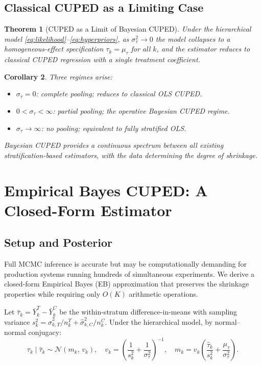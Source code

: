 \documentclass[12pt]{article}
\theoremstyle{plain}
\newtheorem{theorem}{Theorem}
\newtheorem{corollary}[theorem]{Corollary}
\theoremstyle{definition}
\begin{document}
\subsection{Classical CUPED as a Limiting Case}

\begin{theorem}[CUPED as a Limit of Bayesian CUPED]
\label{thm:limit}
Under the hierarchical model \eqref{eq:likelihood}--\eqref{eq:hyperpriors},
as $\sigma_\tau^2 \to 0$ the model collapses to a homogeneous-effect
specification $\tau_k = \mu_\tau$ for all $k$, and the estimator reduces to
classical CUPED regression with a single treatment coefficient.
\end{theorem}

\begin{corollary}
\label{cor:spectrum}
Three regimes arise:
\begin{itemize}[nosep]
  \item $\sigma_\tau = 0$: complete pooling; reduces to classical OLS CUPED.
  \item $0 < \sigma_\tau < \infty$: partial pooling; the operative Bayesian
        CUPED regime.
  \item $\sigma_\tau \to \infty$: no pooling; equivalent to fully stratified
        OLS.
\end{itemize}
Bayesian CUPED provides a continuous spectrum between all existing
stratification-based estimators, with the data determining the degree of
shrinkage.
\end{corollary}

\section{Empirical Bayes CUPED: A Closed-Form Estimator}
\label{sec:eb}

\subsection{Setup and Posterior}

Full MCMC inference is accurate but may be computationally demanding for
production systems running hundreds of simultaneous experiments.
We derive a closed-form Empirical Bayes (EB) approximation that preserves
the shrinkage properties while requiring only $O(K)$ arithmetic operations.

Let $\hat{\tau}_k = \bar{Y}_k^T - \bar{Y}_k^C$ be the within-stratum
difference-in-means with sampling variance
$s_k^2 = \hat{\sigma}_{k,T}^2/n_k^T + \hat{\sigma}_{k,C}^2/n_k^C$.
Under the hierarchical model, by normal--normal conjugacy:
\begin{equation}
  \tau_k \mid \hat{\tau}_k \sim
    \mathcal{N}\!\left(m_k,\, v_k\right),
  \quad
  v_k = \left(\frac{1}{s_k^2} + \frac{1}{\sigma_\tau^2}\right)^{-1},
  \quad
  m_k = v_k\left(\frac{\hat{\tau}_k}{s_k^2} + \frac{\mu_\tau}{\sigma_\tau^2}\right).
  \label{eq:posterior}
\end{equation}
\end{document}
